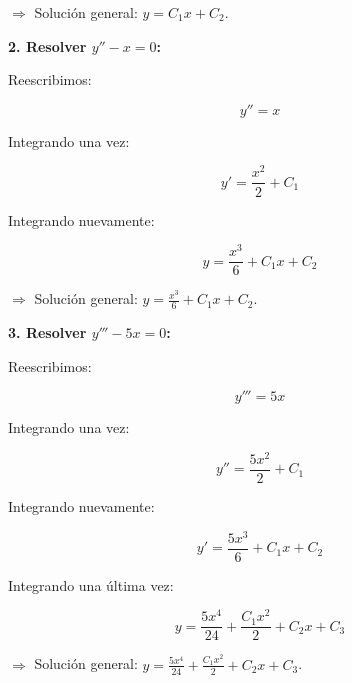 \documentclass[answers]{exam}
\begin{document}
\begin{questions}
		\(\Rightarrow\) Solución general: \( y = C_1 x + C_2 \).

		\newpage

		\textbf{2. Resolver \( y'' - x = 0 \):}

		Reescribimos:

		\[
			y'' = x
		\]

		Integrando una vez:

		\[
			y' = \frac{x^2}{2} + C_1
		\]

		Integrando nuevamente:

		\[
			y = \frac{x^3}{6} + C_1 x + C_2
		\]
		\vspace{2em}

		\(\Rightarrow\) Solución general: \( y = \frac{x^3}{6} + C_1 x + C_2 \).

		\vspace{2em}

		\textbf{3. Resolver \( y''' - 5x = 0 \):}

		Reescribimos:

		\[
			y''' = 5x
		\]

		Integrando una vez:

		\[
			y'' = \frac{5x^2}{2} + C_1
		\]

		Integrando nuevamente:

		\[
			y' = \frac{5x^3}{6} + C_1 x + C_2
		\]

		Integrando una última vez:

		\[
			y = \frac{5x^4}{24} + \frac{C_1 x^2}{2} + C_2 x + C_3
		\]

		\vspace{2em}

		\(\Rightarrow\) Solución general: \( y = \frac{5x^4}{24} + \frac{C_1 x^2}{2} + C_2 x + C_3 \).




\end{questions}
\end{document}

